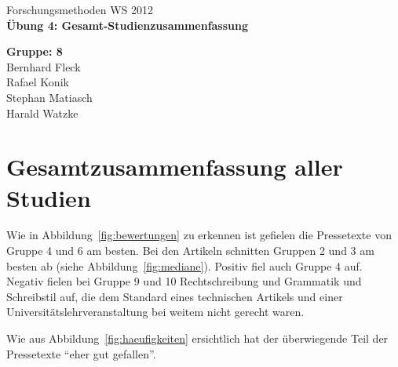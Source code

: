 

 

\begin{titlepage}
\sffamily

{ \Large Forschungsmethoden WS 2012} \\[2cm]
    
{ \Huge \centering \bfseries Übung 4: Gesamt-Studienzusammenfassung \\[1.5cm] }


%

\vfill

{ \large
   { \bfseries Gruppe: 8 \\ }
   Bernhard Fleck \\
   Rafael Konik \\
   Stephan Matiasch \\
   Harald Watzke \\
}
\end{titlepage}


\section{Gesamtzusammenfassung aller Studien} %
\label{sec:zusammenfassung_aller_studien}

Wie in Abbildung~\ref{fig:bewertungen} zu erkennen ist gefielen die
Pressetexte von Gruppe 4 und 6 am besten. Bei den Artikeln schnitten Gruppen 2
und 3 am besten ab (siehe Abbildung~\ref{fig:mediane}). Positiv fiel auch
Gruppe 4 auf. Negativ fielen bei Gruppe 9 und 10 Rechtschreibung und Grammatik
und Schreibstil auf, die dem Standard eines technischen Artikels und einer
Universitätslehrveranstaltung bei weitem nicht gerecht waren.

Wie aus Abbildung~\ref{fig:haeufigkeiten} ersichtlich hat der überwiegende
Teil der Pressetexte \enquote{eher gut gefallen}.

